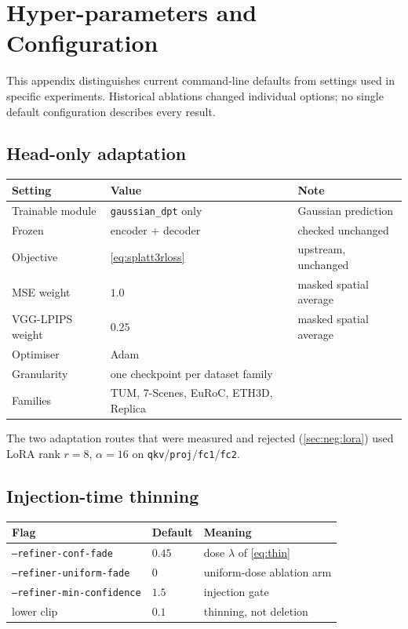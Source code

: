\chapter{Hyper-parameters and Configuration}
\label{app:hyper}

This appendix distinguishes current command-line defaults from settings
used in specific experiments. Historical ablations changed individual
options; no single default configuration describes every result.

\section{Head-only adaptation}

\begin{center}
\begin{tabular}{@{}lll@{}}
\toprule
Setting & Value & Note \\
\midrule
Trainable module   & \texttt{gaussian\_dpt} only & Gaussian prediction \\
Frozen             & encoder + decoder & checked unchanged \\
Objective          & \cref{eq:splatt3rloss} & upstream, unchanged \\
MSE weight         & $1.0$ & masked spatial average \\
VGG-LPIPS weight   & $0.25$ & masked spatial average \\
Optimiser          & Adam~\cite{kingma2015adam} & \\
Granularity        & one checkpoint per dataset family & \\
Families           & TUM, 7-Scenes, EuRoC, ETH3D, Replica & \\
\bottomrule
\end{tabular}
\end{center}

The two adaptation routes that were measured and rejected
(\cref{sec:neg:lora}) used LoRA rank $r{=}8$, $\alpha{=}16$ on
\texttt{qkv}/\texttt{proj}/\texttt{fc1}/\texttt{fc2}.

\section{Injection-time thinning}

\begin{center}
\begin{tabular}{@{}lll@{}}
\toprule
Flag & Default & Meaning \\
\midrule
\texttt{--refiner-conf-fade}    & $0.45$ & dose $\lambda$ of \cref{eq:thin} \\
\texttt{--refiner-uniform-fade} & $0$    & uniform-dose ablation arm \\
\texttt{--refiner-min-confidence} & $1.5$ & injection gate \\
lower clip                       & $0.1$ & thinning, not deletion \\
\bottomrule
\end{tabular}
\end{center}

